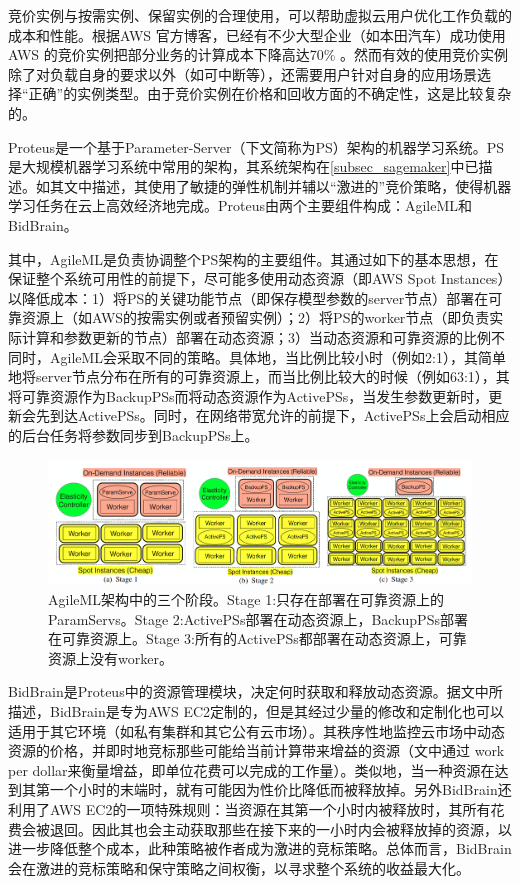 竞价实例与按需实例、保留实例的合理使用，可以帮助虚拟云用户优化工作负载的成本和性能。根据AWS 官方博客，已经有不少大型企业（如本田汽车）成功使用AWS 的竞价实例把部分业务的计算成本下降高达70\% 。然而有效的使用竞价实例除了对负载自身的要求以外（如可中断等），还需要用户针对自身的应用场景选择“正确”的实例类型。由于竞价实例在价格和回收方面的不确定性，这是比较复杂的。

Proteus是一个基于Parameter-Server（下文简称为PS）架构的机器学习系统。PS是大规模机器学习系统中常用的架构，其系统架构在\ref{subsec_sagemaker}中已描述。如其文中描述，其使用了敏捷的弹性机制并辅以“激进的”竞价策略，使得机器学习任务在云上高效经济地完成。Proteus由两个主要组件构成：AgileML和BidBrain。

其中，AgileML是负责协调整个PS架构的主要组件。其通过如下的基本思想，在保证整个系统可用性的前提下，尽可能多使用动态资源（即AWS Spot Instances）以降低成本：1）将PS的关键功能节点（即保存模型参数的server节点）部署在可靠资源上（如AWS的按需实例或者预留实例）；2）将PS的worker节点（即负责实际计算和参数更新的节点）部署在动态资源；3）当动态资源和可靠资源的比例不同时，AgileML会采取不同的策略。具体地，当比例比较小时（例如2:1），其简单地将server节点分布在所有的可靠资源上，而当比例比较大的时候（例如63:1），其将可靠资源作为BackupPSs而将动态资源作为ActivePSs，当发生参数更新时，更新会先到达ActivePSs。同时，在网络带宽允许的前提下，ActivePSs上会启动相应的后台任务将参数同步到BackupPSs上。

\begin{figure}[h]
    \centerline{\includegraphics[width=\textwidth]{figures/agileml-stages.png}}
    \caption{AgileML架构中的三个阶段。Stage 1:只存在部署在可靠资源上的ParamServs。Stage 2:ActivePSs部署在动态资源上，BackupPSs部署在可靠资源上。Stage 3:所有的ActivePSs都部署在动态资源上，可靠资源上没有worker。}
    \label{agileml_stages}
\end{figure}

BidBrain是Proteus中的资源管理模块，决定何时获取和释放动态资源。据文中所描述，BidBrain是专为AWS EC2定制的，但是其经过少量的修改和定制化也可以适用于其它环境（如私有集群和其它公有云市场）。其秩序性地监控云市场中动态资源的价格，并即时地竞标那些可能给当前计算带来增益的资源（文中通过 work per dollar来衡量增益，即单位花费可以完成的工作量）。类似地，当一种资源在达到其第一个小时的末端时，就有可能因为性价比降低而被释放掉。另外BidBrain还利用了AWS EC2的一项特殊规则：当资源在其第一个小时内被释放时，其所有花费会被退回。因此其也会主动获取那些在接下来的一小时内会被释放掉的资源，以进一步降低整个成本，此种策略被作者成为激进的竞标策略。总体而言，BidBrain会在激进的竞标策略和保守策略之间权衡，以寻求整个系统的收益最大化。

